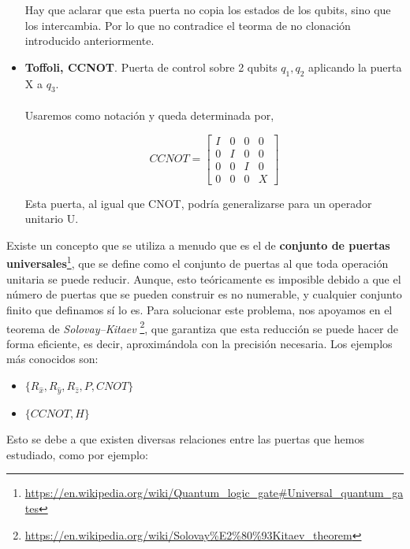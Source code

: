 \begin{itemize}
     Hay que aclarar que esta puerta no copia los estados de los qubits, sino que los intercambia. Por lo que no contradice el teorma de no clonación introducido anteriormente.
     
     \item \textbf{Toffoli, CCNOT}. Puerta de control sobre 2 qubits $q_{1}, q_{2}$ aplicando la puerta X a $q_{3}$. \\ \\ Usaremos como notación   y queda determinada por,
     
     \begin{equation*}
        CCNOT = \begin{bmatrix}
        I & 0 & 0 & 0 \\ 0 & I & 0 & 0 \\ 0 & 0 & I & 0 \\ 0 & 0 & 0 & X
        \end{bmatrix}
    \end{equation*}

     Esta puerta, al igual que CNOT, podría generalizarse para un operador unitario U.
 \end{itemize}

 Existe un concepto que se utiliza a menudo que es el de \textbf{conjunto de puertas universales}\footnote{\url{https://en.wikipedia.org/wiki/Quantum_logic_gate\#Universal_quantum_gates}}, que se define como el conjunto de puertas al que toda operación unitaria se puede reducir. Aunque, esto teóricamente es imposible debido a que el número de puertas que se pueden construir es no numerable, y cualquier conjunto finito que definamos sí lo es. Para solucionar este problema, nos apoyamos en el teorema de \textit{Solovay–Kitaev} \footnote{\url{https://en.wikipedia.org/wiki/Solovay\%E2\%80\%93Kitaev_theorem}}, que garantiza que esta reducción se puede hacer de forma eficiente, es decir, aproximándola con la precisión necesaria. Los ejemplos más conocidos son:

 \begin{itemize}
     \item $\{R_{\hat{x}},R_{\hat{y}},R_{\hat{z}},P,CNOT\}$
     \item $\{CCNOT, H\}$
 \end{itemize}

 Esto se debe a que existen diversas relaciones entre las puertas que hemos estudiado, como por ejemplo:

